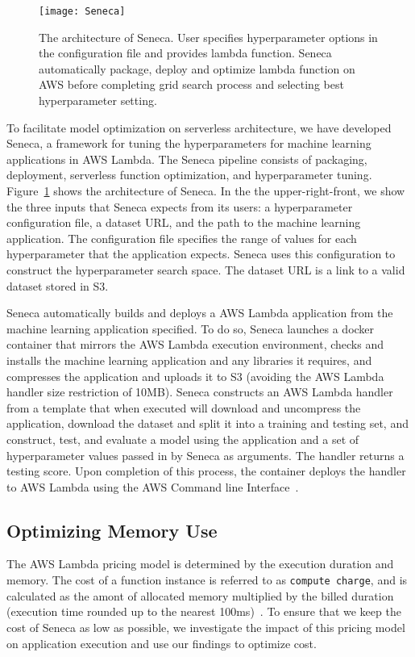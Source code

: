 \begin{figure}[t] \centering 
\texttt{[image: Seneca]}
\caption{The architecture of Seneca. 
User specifies hyperparameter options in the configuration file and provides lambda function. Seneca automatically package, deploy and optimize lambda function on AWS before completing grid search process and selecting best hyperparameter setting.
\label{fig:seneca}}
\end{figure}

To facilitate model optimization on serverless architecture, we have developed Seneca, 
a framework for tuning the hyperparameters for machine learning applications 
in AWS Lambda. 
The Seneca pipeline consists of packaging, deployment, serverless 
function optimization, and hyperparameter tuning. Figure~\ref{fig:seneca} 
shows the architecture of Seneca.  In the the upper-right-front, we
show the three inputs that Seneca expects from its users: a hyperparameter
configuration file, a dataset URL, and the path to 
the machine learning application.
The configuration file
specifies the range of values for each hyperparameter that the 
application expects.  Seneca uses this configuration to construct
the hyperparameter search space.  The dataset URL is a link to a
valid dataset stored in S3.  

Seneca automatically builds and deploys a AWS Lambda application
from the machine learning application specified.
To do so, Seneca launches a docker container that mirrors the
AWS Lambda execution environment, checks and installs
the machine learning application and any libraries it requires,
and compresses the application and uploads it to S3 (avoiding
the AWS Lambda handler size restriction of 10MB).
Seneca constructs an AWS Lambda handler from a template
that when executed will download and uncompress the application,
download the dataset and split it into a training and testing set,
and construct, test, and evaluate a model using the application
and a set of hyperparameter values passed in by Seneca as arguments.
The handler returns a testing score.
Upon completion of this process, the container deploys the handler
to AWS Lambda using the
AWS Command line Interface~\cite{ref:awscli}.


\subsection{Optimizing Memory Use}

The AWS Lambda pricing model is determined by the execution duration 
and memory. The cost of a function instance is referred to as 
\texttt{compute charge}, and is calculated as the amont of 
allocated memory multiplied by the
billed duration (execution time rounded up to the 
nearest 100ms)~\cite{ref:pricing}.
To ensure that we keep the cost of Seneca as low as possible, we investigate
the impact of this pricing model on application execution and use
our findings to optimize cost.


